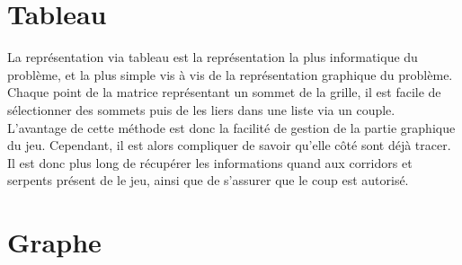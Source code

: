 \documentclass[a4paper,12pt]{report}
\begin{document}
\section{Tableau}
La repr\'esentation via tableau est la repr\'esentation la plus informatique du probl\`eme, et la plus simple vis \`a vis de la repr\'esentation graphique du probl\`eme. Chaque point de la matrice repr\'esentant un sommet de la grille, il est facile de s\'electionner des sommets puis de les liers dans une liste via un couple.\\
L'avantage de cette m\'ethode est donc la facilit\'e de gestion de la partie graphique du jeu. Cependant, il est alors compliquer de savoir qu'elle c\^ot\'e sont d\'ej\`a tracer. Il est donc plus long de r\'ecup\'erer les informations quand aux corridors et serpents pr\'esent de le jeu, ainsi que de s'assurer que le coup est autoris\'e.

\section{Graphe}
\end{document}
